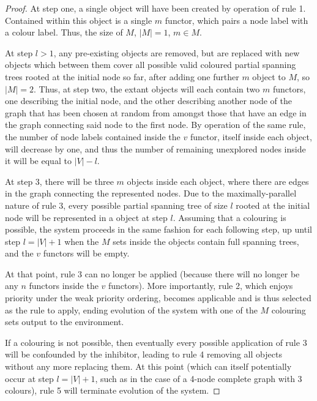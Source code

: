 \begin{proof}
At step one, a single \bo{} object will have been created by operation of rule 1.  Contained within this \bo{} object is a single \(m\) functor, which pairs a node label with a colour label.  Thus, the size of \(M\), \(|M|=1\), \(m \in M\).

At step \(l > 1\), any pre-existing \bo{} objects are removed, but are replaced with new \bo{} objects which between them cover all possible valid coloured partial spanning trees rooted at the initial node so far, after adding one further \(m\) object to \(M\), so \(|M|=2\).  Thus, at step two, the extant \bo{} objects will each contain two \(m\) functors, one describing the initial node, and the other describing another node of the graph that has been chosen at random from amongst those that have an edge in the graph connecting said node to the first node.  By operation of the same rule, the number of node labels contained inside the \(v\) functor, itself inside each \bo{} object, will decrease by one, and thus the number of remaining unexplored nodes inside it will be equal to \(|V| - l\).%

At step 3, there will be three \(m\) objects inside each \bo{} object, where there are edges in the graph connecting the represented nodes.  Due to the maximally-parallel nature of rule 3, every possible partial spanning tree of size \(l\) rooted at the initial node will be represented in a \bo{} object at step \(l\).  Assuming that a colouring is possible, the system proceeds in the same fashion for each following step, up until step \(l = |V| + 1\) when the \(M\) sets inside the \bo{} objects contain full spanning trees, and the \(v\) functors will be empty.

At that point, rule 3 can no longer be applied (because there will no longer be any \(n\) functors inside the \(v\) functors).  More importantly, rule 2, which enjoys priority under the weak priority ordering, becomes applicable and is thus selected as the rule to apply, ending evolution of the system with one of the \(M\) colouring sets output to the environment.

If a colouring is not possible, then eventually every possible application of rule 3 will be confounded by the inhibitor, leading to rule 4 removing all \bo{} objects without any more replacing them.  At this point (which can itself potentially occur at step \(l = |V| + 1\), such as in the case of a 4-node complete graph with 3 colours), rule 5 will terminate evolution of the system.
\end{proof}

